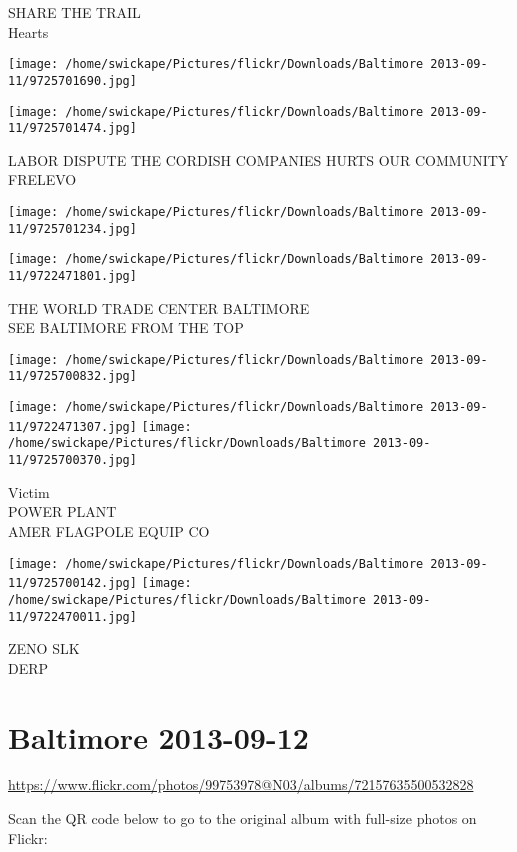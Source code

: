 \documentclass[10pt,letterpaper]{article}
\begin{document}
SHARE THE TRAIL\\
Hearts
\pagebreak

\texttt{[image: /home/swickape/Pictures/flickr/Downloads/Baltimore 2013-09-11/9725701690.jpg]}

\vspace{0.25in}
\texttt{[image: /home/swickape/Pictures/flickr/Downloads/Baltimore 2013-09-11/9725701474.jpg]}

LABOR DISPUTE THE CORDISH COMPANIES HURTS OUR COMMUNITY\\
FRELEVO
\pagebreak

\texttt{[image: /home/swickape/Pictures/flickr/Downloads/Baltimore 2013-09-11/9725701234.jpg]}

\vspace{0.25in}
\texttt{[image: /home/swickape/Pictures/flickr/Downloads/Baltimore 2013-09-11/9722471801.jpg]}

THE WORLD TRADE CENTER BALTIMORE\\
SEE BALTIMORE FROM THE TOP
\pagebreak

\texttt{[image: /home/swickape/Pictures/flickr/Downloads/Baltimore 2013-09-11/9725700832.jpg]}

\vspace{0.25in}
\texttt{[image: /home/swickape/Pictures/flickr/Downloads/Baltimore 2013-09-11/9722471307.jpg]}
\texttt{[image: /home/swickape/Pictures/flickr/Downloads/Baltimore 2013-09-11/9725700370.jpg]}

Victim\\
POWER PLANT\\
AMER FLAGPOLE EQUIP CO
\pagebreak

\texttt{[image: /home/swickape/Pictures/flickr/Downloads/Baltimore 2013-09-11/9725700142.jpg]}
\texttt{[image: /home/swickape/Pictures/flickr/Downloads/Baltimore 2013-09-11/9722470011.jpg]}

ZENO SLK\\
DERP
\pagebreak

\section*{Baltimore 2013-09-12}

\url{https://www.flickr.com/photos/99753978@N03/albums/72157635500532828}

Scan the QR code below to go to the original album with full-size photos on Flickr:
\end{document}

